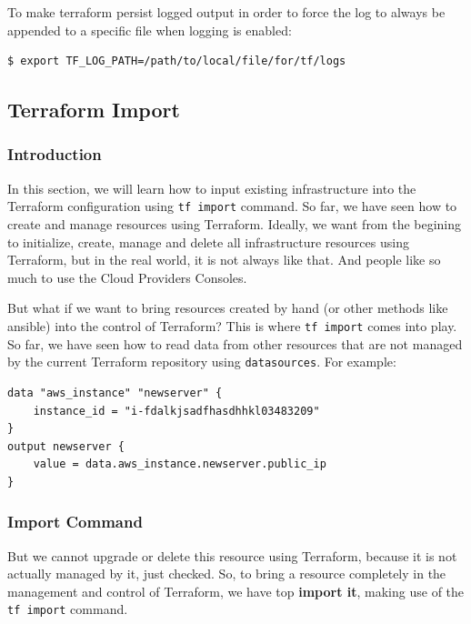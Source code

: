 \documentclass{article}
\newenvironment{codetemplate}[1][]{%
  \mybasecolorbox[#1]
  \itshape
}{%
  \endmybasecolorbox
}
\begin{document}
To make terraform persist logged output in order to force the log to always be appended to a specific file when logging is enabled:
\begin{codetemplate}{}
\begin{verbatim}
$ export TF_LOG_PATH=/path/to/local/file/for/tf/logs
\end{verbatim}
\end{codetemplate}

\subsection{Terraform Import}

\subsubsection{Introduction}

In this section, we will learn how to input existing infrastructure into the Terraform configuration using \verb|tf import| command. So far, we have seen how to create and manage resources using Terraform. Ideally, we want from the begining to initialize, create, manage and delete all infrastructure resources using Terraform, but in the real world, it is not always like that. And people like so much to use the Cloud Providers Consoles.

But what if we want to bring resources created by hand (or other methods like ansible) into the control of Terraform? This is where \verb|tf import| comes into play. So far, we have seen how to read data from other resources that are not managed by the current Terraform repository using \verb|datasources|. For example:

\begin{codetemplate}{}
\begin{verbatim}
data "aws_instance" "newserver" {
    instance_id = "i-fdalkjsadfhasdhhkl03483209"
}
output newserver {
    value = data.aws_instance.newserver.public_ip
}
\end{verbatim}
\end{codetemplate}

\subsubsection{Import Command}

But we cannot upgrade or delete this resource using Terraform, because it is not actually managed by it, just checked. So, to bring a resource completely in the management and control of Terraform, we have top \textbf{import it}, making use of the \verb|tf import| command.
\end{document}
